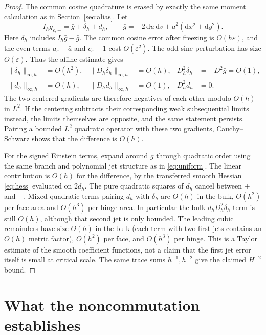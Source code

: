 \documentclass[11pt]{article}
\newcommand{\dd}{\mathrm d}
\begin{document}
\begin{proof}
The common cosine quadrature is erased by exactly the
same moment calculation as in Section~\ref{sec:alias}. Let
\[
       I_hg_{\varepsilon,\pm}=\bar g+\delta_h\pm d_h,
 \qquad \bar g=-2\,\dd u\,\dd v+\bar a^2(\dd x^2+\dd y^2).
\]
Here \(\delta_h\) includes \(I_h\bar g-\bar g\). The common
cosine error after freezing is \(O(h\varepsilon)\), and the
even terms \(a_\varepsilon-\bar a\) and
\(c_\varepsilon-1\) cost \(O(\varepsilon^2)\). The odd
sine perturbation has size \(O(\varepsilon)\). Thus the
affine estimate gives
\begin{align*}
 \|\delta_h\|_{\infty,h}&=O(h^2),&
 \|D_h\delta_h\|_{\infty,h}&=O(h),&
 D_h^2\delta_h&=-D^2\bar g=O(1),\\
 \|d_h\|_{\infty,h}&=O(h),&
 \|D_h d_h\|_{\infty,h}&=O(1),&
 D_h^2 d_h&=0 .
\end{align*}
The two centered gradients are therefore negatives of each
other modulo \(O(h)\) in \(L^2\). If the centering subtracts
their corresponding weak subsequential limits instead, the
limits themselves are opposite, and the same statement
persists. Pairing a bounded \(L^2\) quadratic operator with
these two gradients, Cauchy--Schwarz shows that the difference
is \(O(h)\).

For the signed Einstein terms, expand around \(\bar g\)
through quadratic order using the same branch and polynomial
jet structure as in \eqref{eq:uniform}. The linear contribution
is \(O(h)\) for the difference, by the transferred smooth
Hessian \eqref{eq:hess} evaluated on \(2d_h\). The pure
quadratic squares of \(d_h\) cancel between \(+\) and \(-\).
Mixed quadratic terms pairing \(d_h\) with \(\delta_h\)
are \(O(h)\) in the bulk, \(O(h^2)\) per face area and
\(O(h^3)\) per hinge area. In particular the bulk
\(d_h D_h^2\delta_h\) term is still \(O(h)\), although that
second jet is only bounded. The leading cubic remainders have
size \(O(h)\) in the bulk (each term with two first jets
contains an \(O(h)\) metric factor), \(O(h^2)\) per face,
and \(O(h^3)\) per hinge. This is a Taylor estimate of the
smooth coefficient functions, not a claim that the first
jet error itself is small at critical scale. The same trace
sums \(h^{-1},h^{-2}\) give the claimed \(H^{-2}\) bound.
\end{proof}

\section{What the noncommutation establishes}
\end{document}
